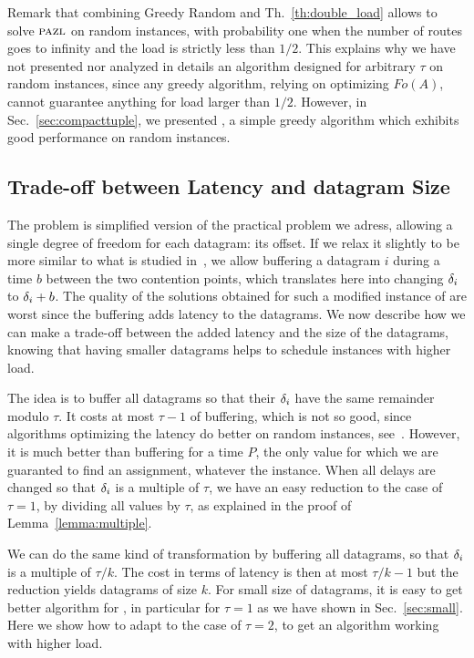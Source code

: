 Remark that combining Greedy Random and Th.~\ref{th:double_load} allows to solve $\textsc{pazl}$ on random instances,
with probability one when the number of routes goes to infinity and the load is strictly less than $1/2$. 
This explains why we have not presented nor analyzed in details an algorithm designed for arbitrary $\tau$ on random instances, since any greedy algorithm, relying on optimizing $Fo(A)$, cannot guarantee anything for load larger than $1/2$.
However, in Sec.~\ref{sec:compacttuple}, we presented \compactfit, a simple greedy algorithm which exhibits good performance on random instances.

\subsection{Trade-off between Latency and datagram Size}

The problem \pma is simplified version of the practical problem we adress, allowing a single degree of freedom for each datagram: its offset. If we relax it slightly to be more similar to what is studied in~\cite{barth2018deterministic}, we allow buffering a datagram $i$ during a time $b$ between the two contention points, which translates here into changing $\delta_i$ to $\delta_i + b$. The quality of the solutions obtained for such a modified instance of \pma are worst since the buffering adds latency to the datagrams. We now describe how we can make a trade-off between the added latency and the size of the datagrams, knowing that having smaller datagrams helps to schedule instances with higher load.


The idea is to buffer all datagrams so that their $\delta_i$ have the same
remainder modulo $\tau$. It costs at most $\tau - 1$ of buffering, which is not
so good, since algorithms optimizing the latency do better on random instances, see~\cite{barth2018deterministic}. However, it is much better than buffering for a time $P$, the only value for which we are guaranted to find an assignment, whatever the instance. When all delays are changed so that $\delta_i$ is a multiple of $\tau$, we have an easy reduction to the case of $\tau = 1$, by dividing all values by $\tau$, as explained in the proof of Lemma~\ref{lemma:multiple}.


We can do the same kind of transformation by buffering all datagrams, so that $\delta_i$ is a multiple of $\tau / k$. The cost in terms of latency is then at most $\tau / k - 1$ but the reduction yields datagrams of size $k$.
For small size of datagrams, it is easy to get better algorithm for \pma, in particular for $\tau = 1$ as we have shown in Sec.~\ref{sec:small}. Here we show how to adapt \compactpair to the case of $\tau = 2$, to get an algorithm working with higher load.



